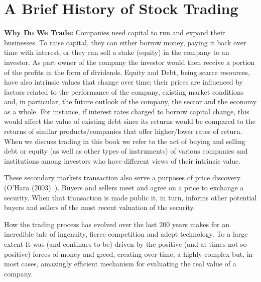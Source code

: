 \section{A Brief History of Stock Trading}

\noindent\textbf{Why Do We Trade:} Companies need capital to run and expand their businesses. To raise capital, they can either borrow money, paying it back over time with interest, or they can sell a stake (equity) in the company to an investor. As part owner of the company the investor would then receive a portion of the profits in the form of dividends. Equity and Debt, being scarce resources, have also intrinsic values that change over time; their prices are influenced by factors related to the performance of the company, existing market conditions and, in particular, the future outlook of the company, the sector and the economy as a whole. For instance, if interest rates charged to borrow capital change, this would affect the value of existing debt since its returns would be compared to the returns of similar products/companies that offer higher/lower rates of return. When we discuss trading in this book we refer to the act of buying and selling debt or equity (as well as other types of instruments) of various companies and institutions among investors who have different views of their intrinsic value.

These secondary markets transaction also serve a purposes of price discovery (O'Hara (2003)~\cite{ohara}). Buyers and sellers meet and agree on a price to exchange a security. When that transaction is made public it, in turn, informs other potential buyers and sellers of the most recent valuation of the security.  

How the trading process has evolved over the last 200 years makes for an incredible tale of ingenuity, fierce competition and adept technology. To a large extent It was (and continues to be) driven by the positive (and at times not so positive) forces of money and greed, creating over time, a highly complex but, in most cases, amazingly efficient mechanism for evaluating the real value of a company. \\


